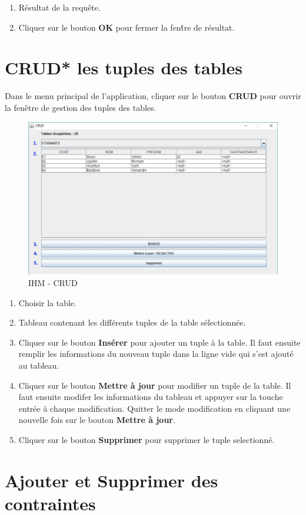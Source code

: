 \begin{enumerate}
\item Résultat de la requ\^ete.
\item Cliquer sur le bouton \textbf{OK} pour fermer la fen\^tre de résultat.
\end{enumerate}

\section{CRUD* les tuples des tables}
Dans le menu principal de l'application, cliquer sur le bouton \textbf{CRUD} pour ouvrir la fen\^etre de gestion des tuples des tables.
\begin{figure}[!h]
\centering
\includegraphics[width=12cm]{./images/manuel/crud.jpg}
\caption{IHM - CRUD}
\label{crud}
\end{figure}

\begin{enumerate}
\item Choisir la table.
\item Tableau contenant les différents tuples de la table sélectionnée.
\item Cliquer sur le bouton \textbf{Insérer} pour ajouter un tuple à la table. Il faut ensuite remplir les informations du nouveau tuple
dans la ligne vide qui s'est ajouté au tableau.
\item Cliquer sur le bouton \textbf{Mettre à jour} pour modifier un tuple de la table. Il faut ensuite modifer les informations du tableau et 
appuyer sur la touche entrée à chaque modification. Quitter le mode modification en cliquant une nouvelle fois sur le bouton \textbf{Mettre à jour}.
\item Cliquer sur le bouton \textbf{Supprimer} pour supprimer le tuple selectionné.
\end{enumerate}

\section{Ajouter et Supprimer des contraintes}
